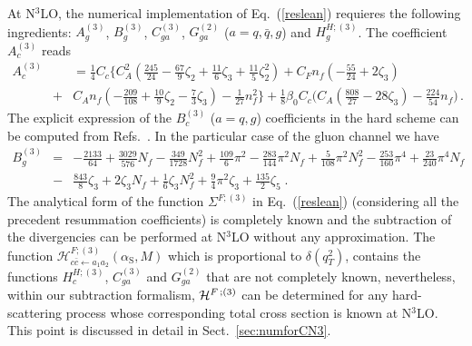 \documentclass[12pt]{article}
\def\beeq{\begin{eqnarray}}
\def\eeeq{\end{eqnarray}}
\def\nn{\nonumber}
\newcommand\as{\alpha_{\mathrm{S}}}
\newcommand\f[2]{\frac{#1}{#2}}
\begin{document}
At N$^{3}$LO, the numerical implementation of Eq.~(\ref{reslean}) requieres the following ingredients: $A^{(3)}_{g}$, $B^{(3)}_{g}$, $C^{(3)}_{ga}$, $G^{(2)}_{ga}$ ($a=q,{\bar q},g$) and $H^{H;(3)}_{g}$. The coefficient $A_c^{(3)}$ \cite{Becher:2010tm} reads
\beeq
\label{acoeff}
A_c^{(3)}\!\!\!&&\!\!\!\!\!\!\!\!  = \f{1}{4} C_{c} \Bigg\{ C_A^2 \left( \frac{245}{24} - \frac{67}{9}\zeta_2
 + \frac{11}{6}\zeta_3 + \frac{11}{5}\zeta_2^2\right) 
+ C_F n_f \left(-\frac{55}{24} + 2\zeta_3\right) \nn\\
 &+& \!\!C_A n_f \left(-\frac{209}{108} + \frac{10}{9}\zeta_2 - \frac{7}{3} \zeta_3\right) 
 - \frac{1}{27} n_f^2 \Bigg\} 
 +\f{1}{8}  \beta_{0} C_c \bigg( C_A\left(\frac{808}{27}-28\zeta_{3}\right)-\frac{224}{54}n_f \bigg)\,.
\eeeq
The explicit expression of the $B_c^{(3)}$ ($a=q,g$) coefficients in the hard scheme can be computed from Refs.~\cite{Li:2016ctv,Vladimirov:2016dll}. In the particular case of the gluon channel we have
\beeq
B_g^{(3)}&=& - \f{2133}{64} +  \f{3029}{576} N_{f} - \f{349}{1728} N_{f}^{2}  + \f{109}{6} \pi^{2} - \f{283}{144} \pi^{2}  N_{f} + \f{5}{108} \pi^{2}  N_{f}^{2}-\f{253}{160} \pi^{4}+\f{23}{240} \pi^{4} N_{f}\nn\\
&-& \f{843}{8} \zeta_{3} + 2 \zeta_{3} N_{f} + \f{1}{6} \zeta_{3} N_{f}^{2} + \f{9}{4} \pi^{2}  \zeta_{3} + \f{135}{2}  \zeta_{5}\;.
\eeeq
The analytical form of the function $\Sigma^{F;(3)}$ in Eq.~(\ref{reslean}) (considering all the precedent resummation coefficients) is completely known and the subtraction of the divergencies can be performed at N$^{3}$LO without any approximation. The function $\mathcal{H}^{F;(3)}_{c\bar{c}\leftarrow a_{1}a_{2}}(\as,M)$ which is proportional to $\delta(q^{2}_{T})$, contains the functions $H^{H;(3)}_{c}$, $C^{(3)}_{ga}$ and $G^{(2)}_{ga}$  that are not completely known, nevertheless, within our subtraction  formalism, ${\cal H}^{F \,;(3)}$ can be determined for any hard-scattering process whose corresponding total cross section is known at N$^{3}$LO. This point is discussed in detail in Sect.~\ref{sec:numforCN3}. 


\setcounter{footnote}{0}
\end{document}
